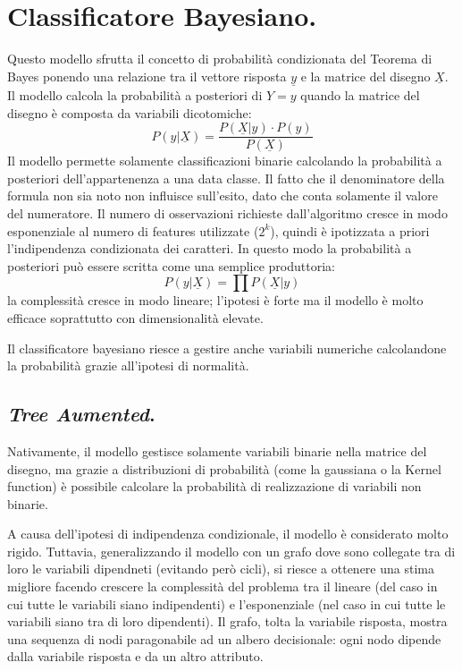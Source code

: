 \documentclass[11pt, a4page, twocolumn]{article}
\begin{document}
\section{Classificatore Bayesiano.}
Questo modello sfrutta il concetto di probabilità condizionata del Teorema di Bayes ponendo una relazione tra il vettore risposta $\underline{y}$ e la matrice del disegno $\underline{X}$.
Il modello calcola la probabilità a posteriori di $Y = y$ quando la matrice del disegno è composta da variabili dicotomiche:
\begin{equation*}
  P(y | \underline{X}) = \frac{P(\underline{X} | y) \cdot P(y)}{P(\underline{X})}
\end{equation*}
Il modello permette solamente classificazioni binarie calcolando la probabilità a posteriori dell'appartenenza a una data classe.
Il fatto che il denominatore della formula non sia noto non influisce sull'esito, dato che conta solamente il valore del numeratore.
Il numero di osservazioni richieste dall'algoritmo cresce in modo esponenziale al numero di features utilizzate ($2^k$), quindi è ipotizzata a priori l'indipendenza condizionata dei caratteri.
In questo modo la probabilità a posteriori può essere scritta come una semplice produttoria:
\begin{equation*}
  P(y
  | \underline{X}) = \prod{}{}{P(\underline{X} | y)}
\end{equation*}
la complessità cresce in modo lineare; l'ipotesi è forte ma il modello è molto efficace soprattutto con dimensionalità elevate.

Il classificatore bayesiano riesce a gestire anche variabili numeriche calcolandone la probabilità grazie all'ipotesi di normalità.

\subsection*{\textit{Tree Aumented}.}
Nativamente, il modello gestisce solamente variabili binarie nella matrice del disegno, ma grazie a distribuzioni di probabilità (come la gaussiana o la Kernel function) è possibile calcolare la probabilità di realizzazione di variabili non binarie.

A causa dell'ipotesi di indipendenza condizionale, il modello è considerato molto rigido.
Tuttavia, generalizzando il modello con un grafo dove sono collegate tra di loro le variabili dipendneti (evitando però cicli), si riesce a ottenere una stima migliore facendo crescere la complessità del problema tra il lineare (del caso in cui tutte le variabili siano indipendenti) e l'esponenziale (nel caso in cui tutte le variabili siano tra di loro dipendenti).
Il grafo, tolta la variabile risposta, mostra una sequenza di nodi paragonabile ad un albero decisionale: ogni nodo dipende dalla variabile risposta e da un altro attributo.
\end{document}
